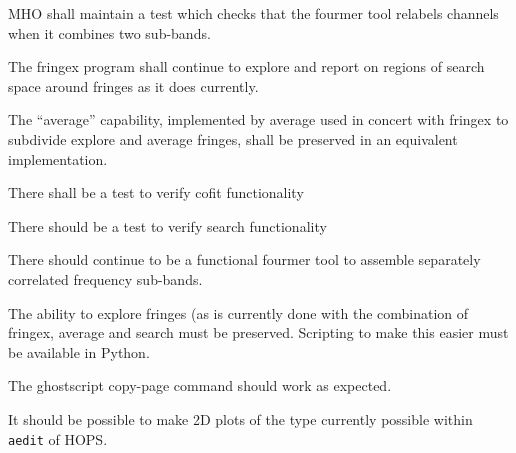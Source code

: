 \begin{description}
 \acs{MHO} shall maintain a test which checks that the \acs{fourmer} 
tool relabels channels when it combines two sub-bands.
  
 The \acs{fringex} program shall continue to explore and report
      on regions of search space around fringes as it does currently.

 The ``average'' capability, implemented by \acs{average}
      used in concert with \acs{fringex} to subdivide explore and average
      fringes, shall be preserved in an equivalent implementation.
      
 There shall be a test to verify \acs{cofit} functionality
      
 There should be a test to verify \acs{search} functionality
      
 There should continue to be a functional \acs{fourmer} tool
      to assemble separately correlated frequency sub-bands.

 The ability to explore fringes (as is currently done with
    the combination of \acs{fringex}, \acs{average} and search must be
    preserved.  Scripting to make this easier must be available in
    \acs{Python}.

 The ghostscript copy-page command should work as expected.

 It should be possible to make 2D plots of the type
    currently possible within \texttt{\acs{aedit}} of \acs{HOPS}.
    

\end{description}

